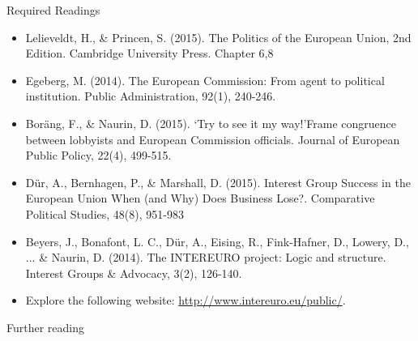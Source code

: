 \noindent Required Readings

\begin{itemize}
	\item Lelieveldt, H., \& Princen, S. (2015). The Politics of the European Union, 2nd Edition. Cambridge University Press. Chapter 6,8
	\item Egeberg, M. (2014). The European Commission: From agent to political institution. Public Administration, 92(1), 240-246.
	\item Bor{\"a}ng, F., \& Naurin, D. (2015). ‘Try to see it my way!’Frame congruence between lobbyists and European Commission officials. Journal of European Public Policy, 22(4), 499-515.
	\item D{\"u}r, A., Bernhagen, P., \& Marshall, D. (2015). Interest Group Success in the European Union When (and Why) Does Business Lose?. Comparative Political Studies, 48(8), 951-983
	\item Beyers, J., Bonafont, L. C., D{\"u}r, A., Eising, R., Fink-Hafner, D., Lowery, D., ... \& Naurin, D. (2014). The INTEREURO project: Logic and structure. Interest Groups \& Advocacy, 3(2), 126-140.
	\item Explore the following website: \url{http://www.intereuro.eu/public/}.
\end{itemize}

\noindent Further reading

